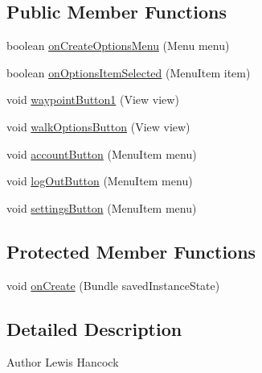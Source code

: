 \subsection*{Public Member Functions}
\begin{DoxyCompactItemize}
\item 
boolean \hyperlink{classuk_1_1ac_1_1swan_1_1digitaltrails_1_1activities_1_1_walk_activity_a4647ace1c980d948ddebcab8fa40cbbc}{on\+Create\+Options\+Menu} (Menu menu)
\item 
boolean \hyperlink{classuk_1_1ac_1_1swan_1_1digitaltrails_1_1activities_1_1_walk_activity_a5a88390a6f9b9c4d20fdaf2a70d79fd6}{on\+Options\+Item\+Selected} (Menu\+Item item)
\item 
void \hyperlink{classuk_1_1ac_1_1swan_1_1digitaltrails_1_1activities_1_1_walk_activity_a947507ddf3a6e31bcc1babc451eed9b2}{waypoint\+Button1} (View view)
\item 
void \hyperlink{classuk_1_1ac_1_1swan_1_1digitaltrails_1_1activities_1_1_walk_activity_a2f8a48656e2d2e81ab76ce4a31a21c9d}{walk\+Options\+Button} (View view)
\item 
void \hyperlink{classuk_1_1ac_1_1swan_1_1digitaltrails_1_1activities_1_1_walk_activity_a5fe111f44c21a8141d8ea99253b5ad84}{account\+Button} (Menu\+Item menu)
\item 
void \hyperlink{classuk_1_1ac_1_1swan_1_1digitaltrails_1_1activities_1_1_walk_activity_a447f143729a7e91fd8ba7db24faa47e1}{log\+Out\+Button} (Menu\+Item menu)
\item 
void \hyperlink{classuk_1_1ac_1_1swan_1_1digitaltrails_1_1activities_1_1_walk_activity_a6eda8e027f01939ed0b123cca1f3b756}{settings\+Button} (Menu\+Item menu)
\end{DoxyCompactItemize}
\subsection*{Protected Member Functions}
\begin{DoxyCompactItemize}
\item 
void \hyperlink{classuk_1_1ac_1_1swan_1_1digitaltrails_1_1activities_1_1_walk_activity_adbad3887302cee19238e9ec86f040454}{on\+Create} (Bundle saved\+Instance\+State)
\end{DoxyCompactItemize}


\subsection{Detailed Description}
\begin{DoxyAuthor}{Author}
Lewis Hancock 
\end{DoxyAuthor}



